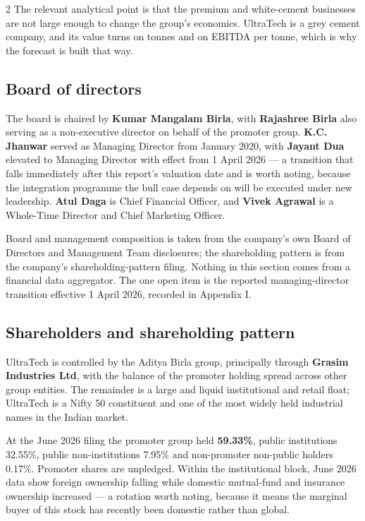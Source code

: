 \begin{paracol}{2}
The relevant analytical point is that the premium and white-cement businesses are not
large enough to change the group's economics. UltraTech is a grey cement company, and
its value turns on tonnes and on EBITDA per tonne, which is why the forecast is built
that way.

\subsection{Board of directors}

The board is chaired by \textbf{Kumar Mangalam Birla}, with \textbf{Rajashree Birla}
also serving as a non-executive director on behalf of the promoter group.
\textbf{K.C. Jhanwar} served as Managing Director from January 2020, with
\textbf{Jayant Dua} elevated to Managing Director with effect from 1 April 2026 — a
transition that falls immediately after this report's valuation date and is worth
noting, because the integration programme the bull case depends on will be executed
under new leadership. \textbf{Atul Daga} is Chief Financial Officer, and
\textbf{Vivek Agrawal} is a Whole-Time Director and Chief Marketing Officer.

\begin{okbox}
Board and management composition is taken from the company's own Board of Directors
and Management Team disclosures; the shareholding pattern is from the company's
shareholding-pattern filing. Nothing in this section comes from a financial data
aggregator. The one open item is the reported managing-director transition effective
1 April 2026, recorded in Appendix I.
\end{okbox}

\subsection{Shareholders and shareholding pattern}

UltraTech is controlled by the Aditya Birla group, principally through
\textbf{Grasim Industries Ltd}, with the balance of the promoter holding spread across
other group entities. The remainder is a large and liquid institutional and retail
float; UltraTech is a Nifty 50 constituent and one of the most widely held industrial
names in the Indian market.

At the June 2026 filing the promoter group held \textbf{59.33\%}, public institutions
32.55\%, public non-institutions 7.95\% and non-promoter non-public holders 0.17\%.
Promoter shares are unpledged. Within the institutional block, June 2026 data show
foreign ownership falling while domestic mutual-fund and insurance ownership increased
— a rotation worth noting, because it means the marginal buyer of this stock has
recently been domestic rather than global.


\end{paracol}
